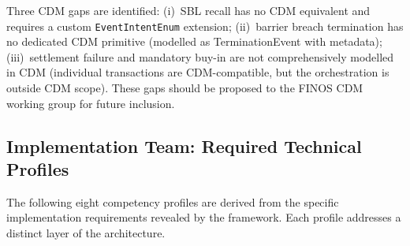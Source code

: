 \documentclass[11pt,a4paper]{article}
\begin{document}
\noindent Three CDM gaps are identified: (i)~SBL recall has no CDM equivalent and requires a custom \texttt{EventIntentEnum} extension; (ii)~barrier breach termination has no dedicated CDM primitive (modelled as TerminationEvent with metadata); (iii)~settlement failure and mandatory buy-in are not comprehensively modelled in CDM (individual transactions are CDM-compatible, but the orchestration is outside CDM scope). These gaps should be proposed to the FINOS CDM working group for future inclusion.

\subsection{Implementation Team: Required Technical Profiles}
\label{sec:temporal-team}

The following eight competency profiles are derived from the specific implementation requirements revealed by the framework. Each profile addresses a distinct layer of the architecture.
\end{document}
